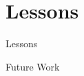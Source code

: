 \documentclass[t,10pt,
mathserif,xcolor=dvipsnames]{beamer}
\begin{document}
\section{Lessons}


\begin{myframe}{Lessons}
 
\end{myframe}

\begin{myframe}{Future Work}

\end{myframe}

\end{document}
